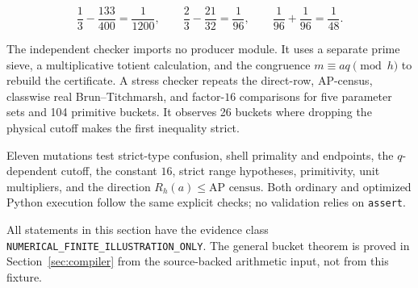 \[
 \frac13-\frac{133}{400}=\frac1{1200},\qquad
 \frac23-\frac{21}{32}=\frac1{96},\qquad
 \frac1{96}+\frac1{96}=\frac1{48}.
\]

The independent checker imports no producer module.  It uses a separate prime
sieve, a multiplicative totient calculation, and the congruence
$m\equiv aq\pmod h$ to rebuild the certificate.  A stress checker repeats
the direct-row, AP-census, classwise real Brun--Titchmarsh, and factor-$16$
comparisons for five parameter sets and 104 primitive buckets.  It observes 26
buckets where dropping the physical cutoff makes the first inequality strict.

Eleven mutations test strict-type confusion, shell primality and endpoints,
the $q$-dependent cutoff, the constant $16$, strict range hypotheses,
primitivity, unit multipliers, and the direction
$R_h(a)\leq\text{AP census}$.  Both ordinary and optimized Python execution
follow the same explicit checks; no validation relies on \texttt{assert}.

All statements in this section have the evidence class
\texttt{NUMERICAL\_FINITE\_ILLUSTRATION\_ONLY}.  The general bucket theorem is
proved in Section~\ref{sec:compiler} from the source-backed arithmetic input,
not from this fixture.
